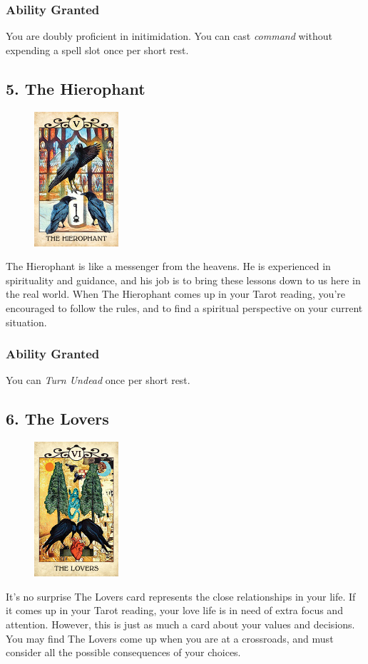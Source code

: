 \documentclass[10pt,twoside,twocolumn,openany,nodeprecatedcode]{dndbook}
\begin{document}
    \subsubsection*{Ability Granted}
    You are doubly proficient in initimidation. You can cast \emph{command} without expending a spell slot once per short rest.

    \subsection*{5. The Hierophant}

    \begin{figure}
        \includegraphics[height=5cm,width=\linewidth]{hierophant.jpg}
    \end{figure}
    The Hierophant is like a messenger from the heavens. He is experienced in spirituality and guidance, and his job is to bring these lessons down to us here in the real world. When The Hierophant comes up in your Tarot reading, you're encouraged to follow the rules, and to find a spiritual perspective on your current situation.

    \subsubsection*{Ability Granted}
    You can \emph{Turn Undead} once per short rest.

    \subsection*{6. The Lovers}

    \begin{figure}
        \includegraphics[height=5cm,width=\linewidth]{lovers.jpg}
    \end{figure}
    It's no surprise The Lovers card represents the close relationships in your life. If it comes up in your Tarot reading, your love life is in need of extra focus and attention. However, this is just as much a card about your values and decisions. You may find The Lovers come up when you are at a crossroads, and must consider all the possible consequences of your choices.
\end{document}
